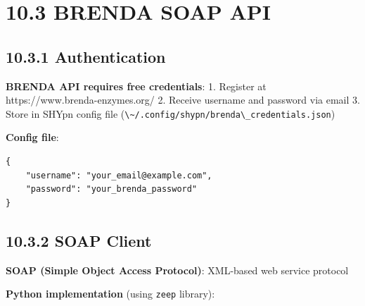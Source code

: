 \hypertarget{brenda-soap-api}{%
\section{10.3 BRENDA SOAP API}\label{brenda-soap-api}}

\hypertarget{authentication}{%
\subsection{10.3.1 Authentication}\label{authentication}}

\textbf{BRENDA API requires free credentials}: 1. Register at
https://www.brenda-enzymes.org/ 2. Receive username and password via
email 3. Store in SHYpn config file
(\passthrough{\lstinline!\~/.config/shypn/brenda\_credentials.json!})

\textbf{Config file}:

\begin{lstlisting}
{
    "username": "your_email@example.com",
    "password": "your_brenda_password"
}
\end{lstlisting}

\hypertarget{soap-client}{%
\subsection{10.3.2 SOAP Client}\label{soap-client}}

\textbf{SOAP (Simple Object Access Protocol)}: XML-based web service
protocol

\textbf{Python implementation} (using \passthrough{\lstinline!zeep!}
library):

